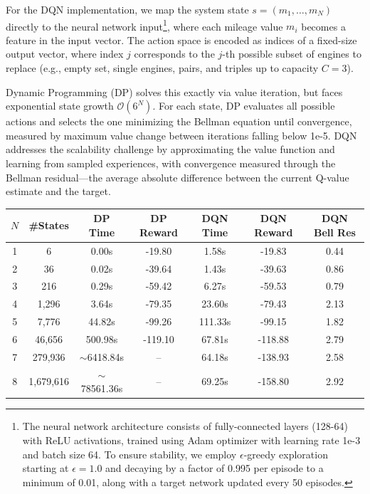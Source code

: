 For the DQN implementation, we map the system state $s = (m_1,\ldots,m_N)$ directly to the neural network input\footnote{The neural network architecture consists of fully-connected layers (128-64) with ReLU activations, trained using Adam optimizer with learning rate 1e-3 and batch size 64. To ensure stability, we employ $\epsilon$-greedy exploration starting at $\epsilon=1.0$ and decaying by a factor of 0.995 per episode to a minimum of 0.01, along with a target network updated every 50 episodes.}, where each mileage value $m_i$ becomes a feature in the input vector. The action space is encoded as indices of a fixed-size output vector, where index $j$ corresponds to the $j$-th possible subset of engines to replace (e.g., empty set, single engines, pairs, and triples up to capacity $C=3$). 

Dynamic Programming (DP) solves this exactly via value iteration, but faces exponential state growth $\mathcal{O}(6^N)$. For each state, DP evaluates all possible actions and selects the one minimizing the Bellman equation until convergence, measured by maximum value change between iterations falling below 1e-5. DQN addresses the scalability challenge by approximating the value function and learning from sampled experiences, with convergence measured through the Bellman residual—the average absolute difference between the current Q-value estimate and the target.

\begin{table}[h]
\centering
\begin{tabular}{ccccccc}
\toprule
$N$ & \#States & DP Time & DP Reward & DQN Time & DQN Reward & DQN Bell Res \\
\midrule
1 & 6 & 0.00s & -19.80 & 1.58s & -19.83 & 0.44 \\
2 & 36 & 0.02s & -39.64 & 1.43s & -39.63 & 0.86 \\
3 & 216 & 0.29s & -59.42 & 6.27s & -59.53 & 0.79 \\
4 & 1,296 & 3.64s & -79.35 & 23.60s & -79.43 & 2.13 \\
5 & 7,776 & 44.82s & -99.26 & 111.33s & -99.15 & 1.82 \\
6 & 46,656 & 500.98s & -119.10 & 67.81s & -118.88 & 2.79 \\
7 & 279,936 & $\sim$6418.84s & -- & 64.18s & -138.93 & 2.58 \\
8 & 1,679,616 & $\sim$78561.36s & -- & 69.25s & -158.80 & 2.92 \\
\bottomrule
\end{tabular}
\end{table}

